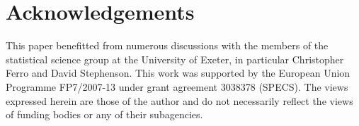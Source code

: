 \documentclass[article]{jss}\usepackage{graphicx, color}
\begin{document}
\section*{Acknowledgements}

This paper benefitted from numerous discussions with the members of the statistical science group at the University of Exeter, in particular Christopher Ferro and David Stephenson.
This work was supported by the European Union Programme FP7/2007-13 under grant agreement 3038378 (SPECS).
The views expressed herein are those of the author and do not necessarily reflect the views of funding bodies or any of their subagencies.



\end{document}
